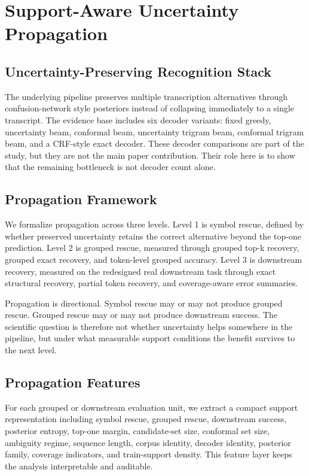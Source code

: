 \section{Support-Aware Uncertainty Propagation}

\subsection{Uncertainty-Preserving Recognition Stack}

The underlying pipeline preserves multiple transcription alternatives through confusion-network style posteriors instead of collapsing immediately to a single transcript. The evidence base includes six decoder variants: fixed greedy, uncertainty beam, conformal beam, uncertainty trigram beam, conformal trigram beam, and a CRF-style exact decoder. These decoder comparisons are part of the study, but they are not the main paper contribution. Their role here is to show that the remaining bottleneck is not decoder count alone.

\subsection{Propagation Framework}

We formalize propagation across three levels. Level 1 is symbol rescue, defined by whether preserved uncertainty retains the correct alternative beyond the top-one prediction. Level 2 is grouped rescue, measured through grouped top-k recovery, grouped exact recovery, and token-level grouped accuracy. Level 3 is downstream recovery, measured on the redesigned real downstream task through exact structural recovery, partial token recovery, and coverage-aware error summaries.

Propagation is directional. Symbol rescue may or may not produce grouped rescue. Grouped rescue may or may not produce downstream success. The scientific question is therefore not whether uncertainty helps somewhere in the pipeline, but under what measurable support conditions the benefit survives to the next level.

\subsection{Propagation Features}

For each grouped or downstream evaluation unit, we extract a compact support representation including symbol rescue, grouped rescue, downstream success, posterior entropy, top-one margin, candidate-set size, conformal set size, ambiguity regime, sequence length, corpus identity, decoder identity, posterior family, coverage indicators, and train-support density. This feature layer keeps the analysis interpretable and auditable.

